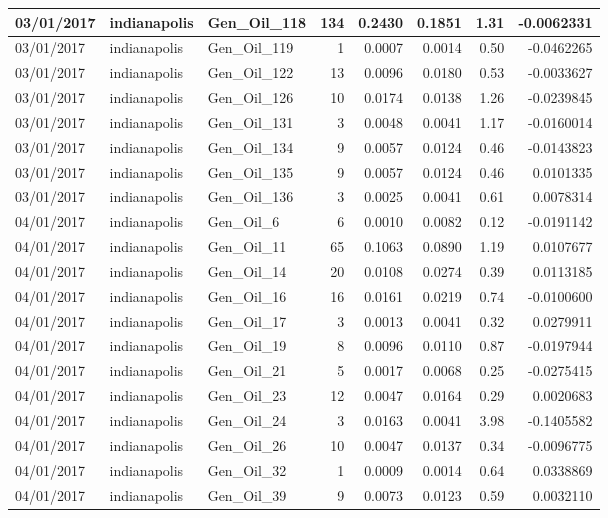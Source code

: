 \documentclass[
  letterpaper,
  DIV=11,
  numbers=noendperiod]{scrartcl}
\begin{document}
\begin{tabular}{l|l|l|r|r|r|r|r}
\hline
03/01/2017 & indianapolis & Gen\_Oil\_118 & 134 & 0.2430 & 0.1851 & 1.31 & -0.0062331\\
\hline
03/01/2017 & indianapolis & Gen\_Oil\_119 & 1 & 0.0007 & 0.0014 & 0.50 & -0.0462265\\
\hline
03/01/2017 & indianapolis & Gen\_Oil\_122 & 13 & 0.0096 & 0.0180 & 0.53 & -0.0033627\\
\hline
03/01/2017 & indianapolis & Gen\_Oil\_126 & 10 & 0.0174 & 0.0138 & 1.26 & -0.0239845\\
\hline
03/01/2017 & indianapolis & Gen\_Oil\_131 & 3 & 0.0048 & 0.0041 & 1.17 & -0.0160014\\
\hline
03/01/2017 & indianapolis & Gen\_Oil\_134 & 9 & 0.0057 & 0.0124 & 0.46 & -0.0143823\\
\hline
03/01/2017 & indianapolis & Gen\_Oil\_135 & 9 & 0.0057 & 0.0124 & 0.46 & 0.0101335\\
\hline
03/01/2017 & indianapolis & Gen\_Oil\_136 & 3 & 0.0025 & 0.0041 & 0.61 & 0.0078314\\
\hline
04/01/2017 & indianapolis & Gen\_Oil\_6 & 6 & 0.0010 & 0.0082 & 0.12 & -0.0191142\\
\hline
04/01/2017 & indianapolis & Gen\_Oil\_11 & 65 & 0.1063 & 0.0890 & 1.19 & 0.0107677\\
\hline
04/01/2017 & indianapolis & Gen\_Oil\_14 & 20 & 0.0108 & 0.0274 & 0.39 & 0.0113185\\
\hline
04/01/2017 & indianapolis & Gen\_Oil\_16 & 16 & 0.0161 & 0.0219 & 0.74 & -0.0100600\\
\hline
04/01/2017 & indianapolis & Gen\_Oil\_17 & 3 & 0.0013 & 0.0041 & 0.32 & 0.0279911\\
\hline
04/01/2017 & indianapolis & Gen\_Oil\_19 & 8 & 0.0096 & 0.0110 & 0.87 & -0.0197944\\
\hline
04/01/2017 & indianapolis & Gen\_Oil\_21 & 5 & 0.0017 & 0.0068 & 0.25 & -0.0275415\\
\hline
04/01/2017 & indianapolis & Gen\_Oil\_23 & 12 & 0.0047 & 0.0164 & 0.29 & 0.0020683\\
\hline
04/01/2017 & indianapolis & Gen\_Oil\_24 & 3 & 0.0163 & 0.0041 & 3.98 & -0.1405582\\
\hline
04/01/2017 & indianapolis & Gen\_Oil\_26 & 10 & 0.0047 & 0.0137 & 0.34 & -0.0096775\\
\hline
04/01/2017 & indianapolis & Gen\_Oil\_32 & 1 & 0.0009 & 0.0014 & 0.64 & 0.0338869\\
\hline
04/01/2017 & indianapolis & Gen\_Oil\_39 & 9 & 0.0073 & 0.0123 & 0.59 & 0.0032110\\

\end{tabular}
\end{document}
